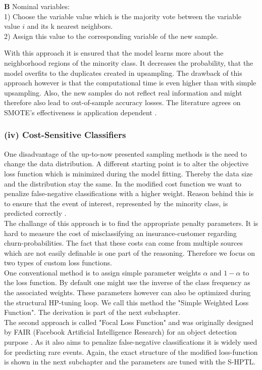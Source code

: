 \documentclass[12pt,titlepage]{article}
\begin{document}
\textbf{B} Nominal variables: \\
1) Choose the variable value which is the majority vote between the variable value $i$ and its k nearest neighbors. \\
2) Assign this value to the corresponding variable of the new sample.
\vspace{6mm}

\noindent
With this approach it is ensured that the model learns more about the neighborhood regions of the minority class. It decreases the probability, that the model overfits to the duplicates created in upsampling. The drawback of this approach however is that the computational time is even higher than with simple upsampling. Also, the new samples do not reflect real information and might therefore also lead to out-of-sample accuracy losses. The literature agrees on SMOTE's effectiveness is application dependent \cite{mining_rarity}. \\

\subsubsection*{(iv) Cost-Sensitive Classifiers} \label{Cost-Sensitive Classifiers}
One disadvantage of the up-to-now presented sampling methods is the need to change the data distribution. A different starting point is to alter the objective loss function which is minimized during the model fitting. Thereby the data size and the distribution stay the same. In the modified cost function we want to penalize false-negative
classifications with a higher weight. Reason behind this is to ensure that the event of interest, represented by the minority class, is predicted correctly \cite{cost_sensitive}. \\
The challange of this approach is to find the appropriate penalty parameters. It is hard to measure the cost of misclassifying an insurance-customer regarding churn-probabilities. The fact that these costs can come from multiple sources which are not easily definable is one part of the reasoning. Therefore we focus on two types of custom loss functions.\\
One conventional method is to assign simple parameter weights $\alpha$ and $1 - \alpha$ to the loss function. By default one might use the inverse of the class frequency as the associated weights. These parameters however can also be optimized during the structural HP-tuning loop. We call this method the "Simple Weighted Loss Function". The derivation is part of the next subchapter.\\
The second approach is called "Focal Loss Function" and was originally designed by FAIR (Facebook Artificial Intelligence Research) for an object detection purpose \cite{focal}. As it also aims to penalize false-negative classifications it is widely used for predicting rare events. Again, the exact structure of the modified loss-function is shown in the next subchapter and the parameters are tuned with the S-HPTL.
\vspace{6mm}
\end{document}
